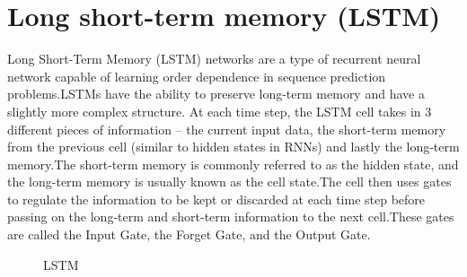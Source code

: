 \section{Long short-term memory (LSTM) }
Long Short-Term Memory (LSTM) networks are a type of recurrent neural network capable of learning order dependence in sequence prediction problems.LSTMs have the  ability to preserve long-term memory and  have a slightly more complex structure. At each time step, the LSTM cell takes in 3 different pieces of information -- the current input data, the short-term memory from the previous cell (similar to hidden states in RNNs) and lastly the long-term memory.The short-term memory is commonly referred to as the hidden state, and the long-term memory is usually known as the cell state.The cell then uses gates to regulate the information to be kept or discarded at each time step before passing on the long-term and short-term information to the next cell.These gates are called the Input Gate, the Forget Gate, and the Output Gate.\cite{lstm}
\begin{figure}
%
  \caption{LSTM}
  \label{fig:key}
\end{figure}
